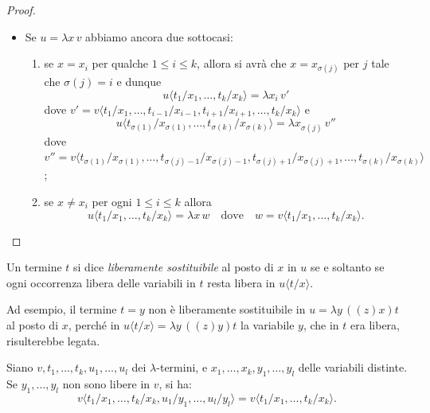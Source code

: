\begin{proof}
\begin{itemize}
\[    \]
    \item Se $u=\lambda x\,v$ abbiamo ancora due sottocasi:
    \begin{enumerate}
        \item[i)] se $x=x_i$ per qualche $1\le i\le k$, allora si avrà che $x=x_{\sigma(j)}$ per $j$ tale che $\sigma(j)=i$ e dunque
        \[
        u\langle t_1/x_1,\dots,t_k/x_k\rangle=\lambda x_i\,v'
        \]
        dove $v'=v\langle t_1/x_1,\dots,t_{i-1}/x_{i-1},t_{i+1}/x_{i+1},\dots,t_k/x_k\rangle$ e
        \[
        u\langle t_{\sigma(1)}/x_{\sigma(1)},\dots,t_{\sigma(k)}/x_{\sigma(k)}\rangle=\lambda x_{\sigma(j)}\,v''
        \]
        dove $v''=v\langle t_{\sigma(1)}/x_{\sigma(1)},\dots,t_{\sigma(j)-1}/x_{\sigma(j)-1},t_{\sigma(j)+1}/x_{\sigma(j)+1},\dots,t_{\sigma(k)}/x_{\sigma(k)}\rangle$;
        \item[ii)] se $x\neq x_i$ per ogni $1\le i\le k$ allora
        \[
        u\langle t_1/x_1,\dots,t_k/x_k\rangle=\lambda x\,w
        \quad\text{dove}\quad
        w=v\langle t_1/x_1,\dots,t_k/x_k\rangle.
        \]
    \end{enumerate}
\end{itemize}
\end{proof}

\begin{defi}[Sostituibilità]
Un termine $t$ si dice \emph{liberamente sostituibile} al posto di $x$ in $u$ se e soltanto se ogni occorrenza libera delle variabili in $t$ resta libera in $u\langle t/x\rangle$.
\end{defi}

Ad esempio, il termine $t=y$ non è liberamente sostituibile in $u=\lambda y\,((z)x)t$ al posto di $x$, perché in $u\langle t/x\rangle=\lambda y\,((z)y)t$ la variabile $y$, che in $t$ era libera, risulterebbe legata.

\begin{lemm}
Siano $v,t_1,\dots,t_k,u_1,\dots,u_l$ dei $\lambda$-termini, e $x_1,\dots,x_k,y_1,\dots,y_l$ delle variabili distinte. Se $y_1,\dots,y_l$ non sono libere in $v$, si ha:
\[
v\langle t_1/x_1,\dots,t_k/x_k,u_1/y_1,\dots,u_l/y_l\rangle=v\langle t_1/x_1,\dots,t_k/x_k\rangle.
\]
\end{lemm}

